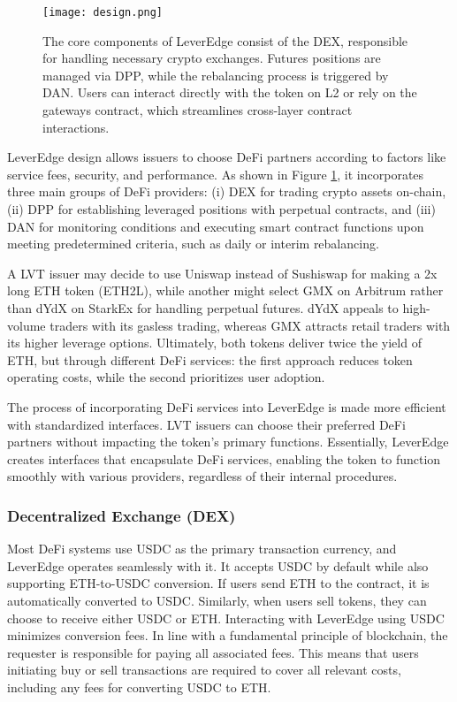\begin{figure}[t]
	\centering
	\texttt{[image: design.png]}
	\caption[LeverEdge components: DEX, DPP, DAN, and gateway]{The core components of LeverEdge consist of the DEX, responsible for handling necessary crypto exchanges. Futures positions are managed via DPP, while the rebalancing process is triggered by DAN. Users can interact directly with the token on L2 or rely on the gateways contract, which streamlines cross-layer contract interactions.}
	\label{fig:design}
\end{figure}

LeverEdge design allows issuers to choose DeFi partners according to factors like service fees, security, and performance. As shown in Figure \ref{fig:design}, it incorporates three main groups of DeFi providers: (i) DEX for trading crypto assets on-chain, (ii) DPP for establishing leveraged positions with perpetual contracts, and (iii) DAN for monitoring conditions and executing smart contract functions upon meeting predetermined criteria, such as daily or interim rebalancing.

\begin{example}
	A LVT issuer may decide to use Uniswap instead of Sushiswap for making a 2x long ETH token (ETH2L), while another might select GMX on Arbitrum rather than dYdX on StarkEx for handling perpetual futures. dYdX appeals to high-volume traders with its gasless trading, whereas GMX attracts retail traders with its higher leverage options. Ultimately, both tokens deliver twice the yield of ETH, but through different DeFi services: the first approach reduces token operating costs, while the second prioritizes user adoption.
\end{example}

The process of incorporating DeFi services into LeverEdge is made more efficient with standardized interfaces. LVT issuers can choose their preferred DeFi partners without impacting the token's primary functions. Essentially, LeverEdge creates interfaces that encapsulate DeFi services, enabling the token to function smoothly with various providers, regardless of their internal procedures.

\subsubsection{Decentralized Exchange (DEX)}
Most DeFi systems use USDC as the primary transaction currency, and LeverEdge operates seamlessly with it. It accepts USDC by default while also supporting ETH-to-USDC conversion. If users send ETH to the contract, it is automatically converted to USDC. Similarly, when users sell tokens, they can choose to receive either USDC or ETH. Interacting with LeverEdge using USDC minimizes conversion fees. In line with a fundamental principle of blockchain, the requester is responsible for paying all associated fees. This means that users initiating buy or sell transactions are required to cover all relevant costs, including any fees for converting USDC to ETH.

